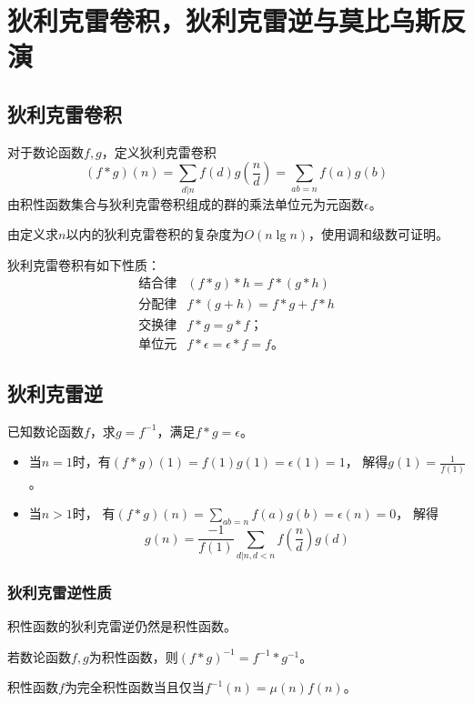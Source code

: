 \section{狄利克雷卷积，狄利克雷逆与莫比乌斯反演}
\subsection{狄利克雷卷积}
对于数论函数$f,g$，定义狄利克雷卷积
\begin{displaymath}
	(f*g)(n)=\sum_{d|n}{f(d)g(\frac{n}{d})}=\sum_{ab=n}{f(a)g(b)}
\end{displaymath}
由积性函数集合与狄利克雷卷积组成的群的乘法单位元为元函数$\epsilon$。

由定义求$n$以内的狄利克雷卷积的复杂度为$O(n\lg n)$，使用调和级数可证明。

狄利克雷卷积有如下性质：
\begin{eqnarray*}
	\textrm{结合律} & (f*g)*h=f*(g*h)\\
	\textrm{分配律} & f*(g+h)=f*g+f*h\\
	\textrm{交换律} & f*g=g*f；\\
	\textrm{单位元} & f*\epsilon=\epsilon*f=f。
\end{eqnarray*}
\subsection{狄利克雷逆}
已知数论函数$f$，求$g=f^{-1}$，满足$f*g=\epsilon$。
\begin{itemize}
	\item 当$n=1$时，有$(f*g)(1)=f(1)g(1)=\epsilon(1)=1$，
	      解得$g(1)=\frac{1}{f(1)}$。
	\item 当$n>1$时，
	      有$\displaystyle (f*g)(n)=\sum_{ab=n}{f(a)g(b)}=\epsilon(n)=0$，
		解得
		\begin{displaymath}
		g(n)=\frac{-1}{f(1)}\sum_{d|n,d<n}{f(\frac{n}{d})g(d)}
		\end{displaymath}
\end{itemize}
\subsubsection{狄利克雷逆性质}
\begin{property}
	积性函数的狄利克雷逆仍然是积性函数。
\end{property}
\begin{property}
	若数论函数$f,g$为积性函数，则$(f*g)^{-1}=f^{-1}*g^{-1}$。
\end{property}
\begin{property}\label{CMFP}
	积性函数$f$为完全积性函数当且仅当$f^{-1}(n)=\mu(n)f(n)$。
\end{property}
